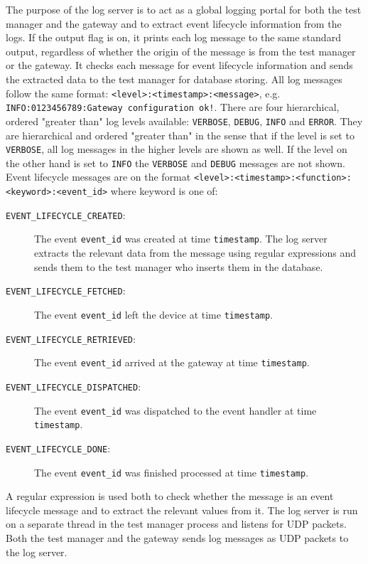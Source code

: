 The purpose of the log server is to act as a global logging portal for both the
test manager and the gateway and to extract event lifecycle information from
the logs. If the output flag is on, it prints each log message to the same
standard output, regardless of whether the origin of the message is from the
test manager or the gateway. It checks each message for event lifecycle
information and sends the extracted data to the test manager for database
storing. All log messages follow the same format:
\texttt{<level>:<timestamp>:<message>}, e.g. \texttt{INFO:0123456789:Gateway
configuration ok!}. There are four hierarchical, ordered "greater than" log
levels available: \texttt{VERBOSE}, \texttt{DEBUG}, \texttt{INFO} and
\texttt{ERROR}. They are hierarchical and ordered "greater than" in the sense
that if the level is set to \texttt{VERBOSE}, all log messages in the higher
levels are shown as well. If the level on the other hand is set to
\texttt{INFO} the \texttt{VERBOSE} and \texttt{DEBUG} messages are not shown.
Event lifecycle messages are on the format
\texttt{<level>:<timestamp>:<function>:<keyword>:<event\_id>} where keyword is
one of:

\begin{description}

\item[\texttt{EVENT\_LIFECYCLE\_CREATED}:] The event \texttt{event\_id} was
created at time \texttt{timestamp}. The log server extracts the relevant data
from the message using regular expressions and sends them to the test manager
who inserts them in the database.

\item[\texttt{EVENT\_LIFECYCLE\_FETCHED}:] The event \texttt{event\_id} left
the device at time \texttt{timestamp}.

\item[\texttt{EVENT\_LIFECYCLE\_RETRIEVED}:] The event \texttt{event\_id}
arrived at the gateway at time \texttt{timestamp}.

\item[\texttt{EVENT\_LIFECYCLE\_DISPATCHED}:] The event \texttt{event\_id} was
dispatched to the event handler at time \texttt{timestamp}.

\item[\texttt{EVENT\_LIFECYCLE\_DONE}:] The event \texttt{event\_id} was
finished processed at time \texttt{timestamp}.

\end{description}

A regular expression is used both to check whether the message is an event
lifecycle message and to extract the relevant values from it. The log server is
run on a separate thread in the test manager process and listens for UDP
packets. Both the test manager and the gateway sends log messages as UDP
packets to the log server.

